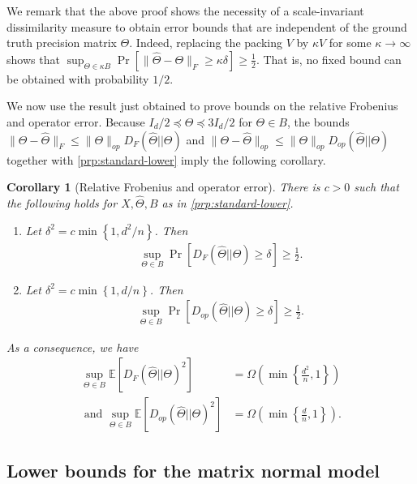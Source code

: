 \documentclass[aos]{imsart}
\newtheorem{corollary}[theorem]{Corollary}
\theoremstyle{definition}
\numberwithin{equation}{section}
\newcommand{\htheta}{\widehat{\Theta}}
\newcommand{\E}{\mathbb{E}}
\begin{document}
We remark that the above proof shows the necessity of a scale-invariant dissimilarity measure to obtain error bounds that are independent of the ground truth precision matrix $\Theta$. Indeed, replacing the packing $V$ by $\kappa V$ for some $\kappa \to \infty$ shows that $\sup_{\Theta \in \kappa B} \Pr\left[ \| \htheta - \Theta\|_F \geq \kappa \delta \right] \geq \frac{1}{2}$. That is, no fixed bound can be obtained with probability $1/2$. 

We now use the result just obtained to prove bounds on the relative Frobenius and operator error. Because $I_d/2 \preceq \Theta \preceq 3I_d/2$ for $\Theta \in B$, the bounds $\|\Theta - \htheta\|_F \leq \|\Theta\|_{op} D_F(\htheta|| \Theta)$ and $\|\Theta - \htheta\|_{op} \leq \|\Theta\|_{op} D_{op}(\htheta|| \Theta)$ together with \cref{prp:standard-lower} imply the following corollary.
\begin{corollary}[Relative Frobenius and operator error]\label{prp:relative-lower}
There is $c > 0$ such that the following holds for $X, \htheta, B$ as in \cref{prp:standard-lower}.
\begin{enumerate}
\item Let $\delta^2 = c\min \left\{1,d^2/n\right\}$. Then
\begin{align}
\sup_{\Theta \in B} \Pr\left[ D_F(\htheta|| \Theta)  \geq \delta\right] \geq \frac{1}{2}.\label{eq:df-lower}
\end{align}
\item Let $\delta^2 = c\min \left\{1,d/n\right\}$. Then
 \begin{align}
\sup_{\Theta \in B} \Pr\left[ D_{op}(\htheta|| \Theta) \geq \delta\right] \geq \frac{1}{2}. \label{eq:dop-lower}
\end{align}
\end{enumerate}
As a consequence, we have 
\begin{align*}\sup_{\Theta \in B}\E[D_F(\htheta|| \Theta)^2] &=\Omega\left( \min \left\{\frac{d^2}{n},1\right\}\right)\\
\text{ and } \sup_{\Theta \in B}\E[D_{op}(\htheta|| \Theta)^2] &= \Omega\left( \min \left\{\frac{d}{n},1\right\}\right).\end{align*}

\end{corollary}





\subsection{Lower bounds for the matrix normal model}
\end{document}
